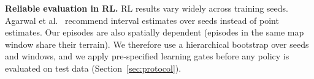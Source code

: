 \textbf{Reliable evaluation in RL.}
RL results vary widely across training seeds. Agarwal et al.~\cite{agarwal2021rliable} recommend interval estimates over seeds instead of point estimates. Our episodes are also spatially dependent (episodes in the same map window share their terrain). We therefore use a hierarchical bootstrap over seeds and windows, and we apply pre-specified learning gates before any policy is evaluated on test data (Section~\ref{sec:protocol}).
